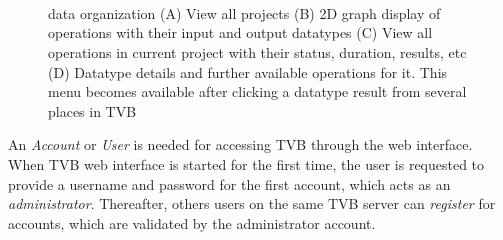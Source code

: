  \begin{figure}[!htbp]

		\centering
		\\
		\\
		\\
		\caption{\TVB data organization
		(A) View all projects
		(B) 2D graph display of operations with their input and output datatypes 
		(C) View all operations in current project with their status, duration, results, etc
		(D) Datatype details and further available operations for it. This menu becomes available after clicking a datatype result from several places in TVB }
				\label{fig:project}
\end{figure}

		An \emph{Account} or \emph{User} is needed for accessing TVB through
		the web interface.  When TVB web interface is started for the first
		time, the user is requested to provide a username and 
		password for the first account, which acts as an \emph{administrator}.
        Thereafter, others users on the same TVB server can \emph{register}
		for accounts, which are validated by the administrator account.

